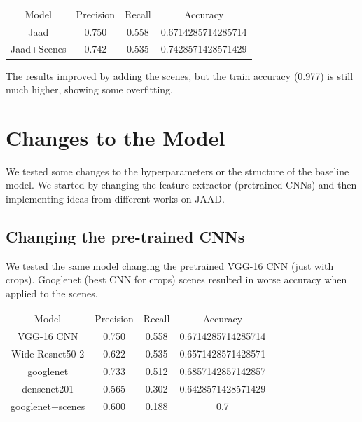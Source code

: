 \documentclass[11pt]{article}
\begin{document}
    \begin{center}
    \begin{tabular}{| c c c c |}\hline
     Model & Precision & Recall & Accuracy\\
     Jaad & 0.750 & 0.558 & 0.6714285714285714 \\
     Jaad+Scenes & 0.742 & 0.535 & 0.7428571428571429\\\hline
    \end{tabular}
    \end{center}

    The results improved by adding the scenes, but the train accuracy (0.977) is still much higher, showing some overfitting.



\section{Changes to the Model}
We tested some changes to the hyperparameters or the structure of the baseline model.
We started by changing the feature extractor (pretrained CNNs) and then implementing ideas from different works on JAAD.

\subsection*{Changing the pre-trained CNNs}
We tested the same model changing the pretrained VGG-16 CNN (just with crops).
Googlenet (best CNN for crops) scenes resulted in worse accuracy when applied to the scenes.


\begin{center}
\begin{tabular}{| c c c c |}\hline
    Model           & Precision & Recall & Accuracy\\
    VGG-16 CNN      & 0.750     & 0.558  & 0.6714285714285714 \\
    Wide Resnet50 2 & 0.622     & 0.535  & 0.6571428571428571 \\
    googlenet       & 0.733     & 0.512  & 0.6857142857142857 \\
    densenet201     & 0.565     & 0.302  & 0.6428571428571429 \\
    googlenet+scenes &  0.600  &  0.188     &  0.7 \\              \hline



\end{tabular}
\end{center}
\end{document}
